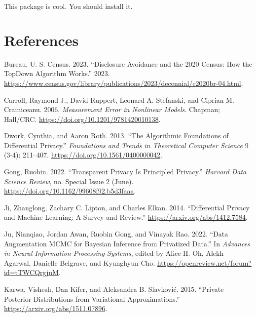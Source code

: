 This package is cool. You should install it.

\hypertarget{references}{%
\section*{References}\label{references}}

\hypertarget{refs}{}
\begin{CSLReferences}{1}{0}
\leavevmode{}%
Bureau, U. S. Census. 2023. {``Disclosure Avoidance and the 2020 Census: How the TopDown Algorithm Works.''} 2023. \url{https://www.census.gov/library/publications/2023/decennial/c2020br-04.html}.

\leavevmode{}%
Carroll, Raymond J., David Ruppert, Leonard A. Stefanski, and Ciprian M. Crainiceanu. 2006. \emph{Measurement Error in Nonlinear Models}. Chapman; Hall/CRC. \url{https://doi.org/10.1201/9781420010138}.

\leavevmode{}%
Dwork, Cynthia, and Aaron Roth. 2013. {``The Algorithmic Foundations of Differential Privacy.''} \emph{Foundations and Trends{\textregistered} in Theoretical Computer Science} 9 (3-4): 211--407. \url{https://doi.org/10.1561/0400000042}.

\leavevmode{}%
Gong, Ruobin. 2022. {``Transparent Privacy Is Principled Privacy.''} \emph{Harvard Data Science Review}, no. Special Issue 2 (June). \url{https://doi.org/10.1162/99608f92.b5d3faaa}.

\leavevmode{}%
Ji, Zhanglong, Zachary C. Lipton, and Charles Elkan. 2014. {``Differential Privacy and Machine Learning: A Survey and Review.''} \url{https://arxiv.org/abs/1412.7584}.

\leavevmode{}%
Ju, Nianqiao, Jordan Awan, Ruobin Gong, and Vinayak Rao. 2022. {``Data Augmentation {MCMC} for Bayesian Inference from Privatized Data.''} In \emph{Advances in Neural Information Processing Systems}, edited by Alice H. Oh, Alekh Agarwal, Danielle Belgrave, and Kyunghyun Cho. \url{https://openreview.net/forum?id=tTWCQrgjuM}.

\leavevmode{}%
Karwa, Vishesh, Dan Kifer, and Aleksandra B. Slavković. 2015. {``Private Posterior Distributions from Variational Approximations.''} \url{https://arxiv.org/abs/1511.07896}.


\end{CSLReferences}
